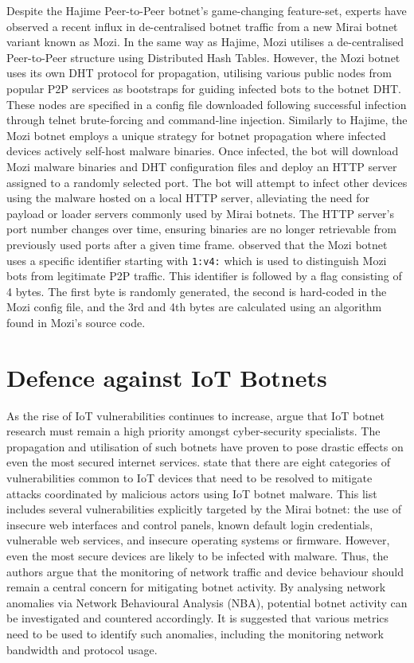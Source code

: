 Despite the Hajime Peer-to-Peer botnet's game-changing feature-set, experts have observed a recent influx in de-centralised botnet traffic from a new Mirai botnet variant known as Mozi. \citep{Netlab2019} In the same way as Hajime, Mozi utilises a de-centralised Peer-to-Peer structure using Distributed Hash Tables. However, the Mozi botnet uses its own DHT protocol for propagation, utilising various public nodes from popular P2P services as bootstraps for guiding infected bots to the botnet DHT. These nodes are specified in a config file downloaded following successful infection through telnet brute-forcing and command-line injection. Similarly to Hajime, the Mozi botnet employs a unique strategy for botnet propagation where infected devices actively self-host malware binaries. Once infected, the bot will download Mozi malware binaries and DHT configuration files and deploy an HTTP server assigned to a randomly selected port. The bot will attempt to infect other devices using the malware hosted on a local HTTP server, alleviating the need for payload or loader servers commonly used by Mirai botnets. The HTTP server's port number changes over time, ensuring binaries are no longer retrievable from previously used ports after a given time frame. \citet{Netlab2019} observed that the Mozi botnet uses a specific identifier starting with \texttt{1:v4:} which is used to distinguish Mozi bots from legitimate P2P traffic. This identifier is followed by a flag consisting of 4 bytes. The first byte is randomly generated, the second is hard-coded in the Mozi config file, and the 3rd and 4th bytes are calculated using an algorithm found in Mozi's source code.




\section{Defence against IoT Botnets}

As the rise of IoT vulnerabilities continues to increase, \citet{Bertino2017} argue that IoT botnet research must remain a high priority amongst cyber-security specialists. The propagation and utilisation of such botnets have proven to pose drastic effects on even the most secured internet services. \citet{Bertino2017} state that there are eight categories of vulnerabilities common to IoT devices that need to be resolved to mitigate attacks coordinated by malicious actors using IoT botnet malware. This list includes several vulnerabilities explicitly targeted by the Mirai botnet: the use of insecure web interfaces and control panels, known default login credentials, vulnerable web services, and insecure operating systems or firmware. However, even the most secure devices are likely to be infected with malware. Thus, the authors argue that the monitoring of network traffic and device behaviour should remain a central concern for mitigating botnet activity. By analysing network anomalies via Network Behavioural Analysis (NBA), potential botnet activity can be investigated and countered accordingly. It is suggested that various metrics need to be used to identify such anomalies, including the monitoring network bandwidth and protocol usage.

